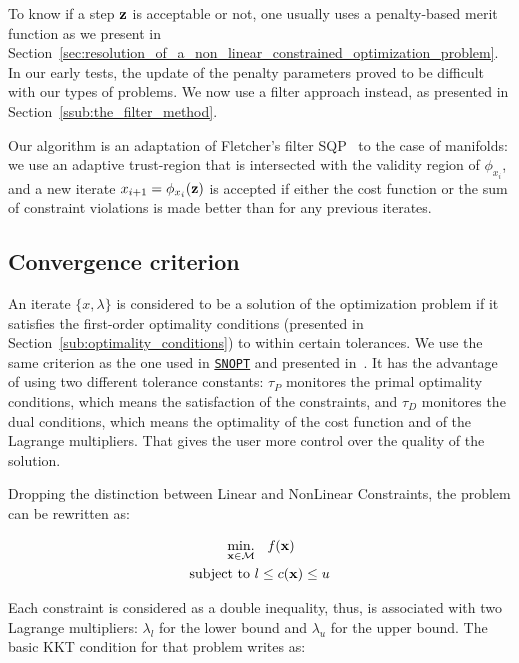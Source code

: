 To know if a step ${\bf z}$ is acceptable or not, one usually uses a penalty-based merit function as we present in Section~\ref{sec:resolution_of_a_non_linear_constrained_optimization_problem}.
In our early tests, the update of the penalty parameters proved to be difficult with our types of problems.
We now use a filter approach instead, as presented in Section~\ref{ssub:the_filter_method}.

Our algorithm is an adaptation of Fletcher's filter SQP~\cite{fletcher:mathprog:2000} to the case of manifolds: we use an adaptive trust-region that is intersected with the validity region of $\phi_{x_i}$, and a new iterate $x_{i+1} = \phi_{x_i}({\bf z})$ is accepted if either the cost function or the sum of constraint violations is made better than for any previous iterates.

\subsection{Convergence criterion}
\label{sub:convergence_criterion}

An iterate $\{x,\lambda\}$ is considered to be a solution of the optimization problem if it satisfies the first-order optimality conditions (presented in Section~\ref{sub:optimality_conditions}) to within certain tolerances.
We use the same criterion as the one used in \href{http://www.sbsi-sol-optimize.com/asp/sol_product_snopt.htm}{{\tt SNOPT}} and presented in~\cite{gill:snopt:2002}.
It has the advantage of using two different tolerance constants: $\tau_P$ monitores the primal optimality conditions, which means the satisfaction of the constraints, and $\tau_D$ monitores the dual conditions, which means the optimality of the cost function and of the Lagrange multipliers.
That gives the user more control over the quality of the solution.

Dropping the distinction between Linear and NonLinear Constraints,
the problem can be rewritten as:

\begin{align}
\begin{split}
\label{eq:problem}
  \operatorname*{min.}_{\bf x \in \mathcal{M}} & \quad \mbox{\emph{f}}({\bf x}) \\
  \text{subject to }&
  l \leq c({\bf x}) \leq u \\
\end{split}
\end{align}

Each constraint is considered as a double inequality, thus, is associated with two Lagrange multipliers: $\lambda_l$ for the lower bound and $\lambda_u$ for the upper bound.
The basic KKT condition for that problem writes as:

